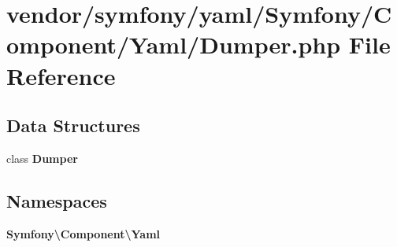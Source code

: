 \section{vendor/symfony/yaml/\+Symfony/\+Component/\+Yaml/\+Dumper.php File Reference}
\label{symfony_2yaml_2_symfony_2_component_2_yaml_2_dumper_8php}
\subsection*{Data Structures}
\begin{DoxyCompactItemize}
\item 
class {\bf Dumper}
\end{DoxyCompactItemize}
\subsection*{Namespaces}
\begin{DoxyCompactItemize}
\item 
 {\bf Symfony\textbackslash{}\+Component\textbackslash{}\+Yaml}
\end{DoxyCompactItemize}
